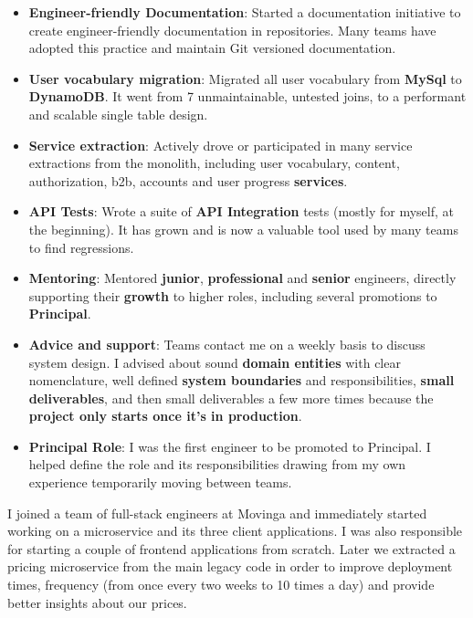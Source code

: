 \documentclass[10pt,a4paper,ragged2e,withhyper]{altacv}
\begin{document}
\begin{paracol}{2}
{\begin{itemize}
\item \textbf{Engineer-friendly Documentation}: Started a documentation initiative to create engineer-friendly documentation in repositories. Many teams have adopted this practice and maintain Git versioned documentation.
\item \textbf{User vocabulary migration}: Migrated all user vocabulary from \textbf{MySql} to \textbf{DynamoDB}. It went from 7 unmaintainable, untested joins, to a performant and scalable single table design.
\item \textbf{Service extraction}: Actively drove or participated in many service extractions from the monolith, including user vocabulary, content, authorization, b2b, accounts and user progress \textbf{services}.
\item \textbf{API Tests}: Wrote a suite of \textbf{API Integration} tests (mostly for myself, at the beginning). It has grown and is now a valuable tool used by many teams to find regressions.
\item \textbf{Mentoring}: Mentored \textbf{junior}, \textbf{professional} and \textbf{senior} engineers, directly supporting their \textbf{growth} to higher roles, including several promotions to \textbf{Principal}.
\item \textbf{Advice and support}: Teams contact me on a weekly basis to discuss system design. I advised about sound \textbf{domain entities} with clear nomenclature, well defined \textbf{system boundaries} and responsibilities, \textbf{small deliverables}, and then small deliverables a few more times because the \textbf{project only starts once it's in production}.
\item \textbf{Principal Role}: I was the first engineer to be promoted to Principal. I helped define the role and its responsibilities drawing from my own experience temporarily moving between teams.
\end{itemize}
}

\divider


{\RaggedRight
I joined a team of full-stack engineers at Movinga and immediately started working on a microservice and its three client applications. I was also responsible for starting a couple of frontend applications from scratch. Later we extracted a pricing microservice from the main legacy code in order to improve deployment times, frequency (from once every two weeks to 10 times a day) and provide better insights about our prices.

}
\end{paracol}
\end{document}
